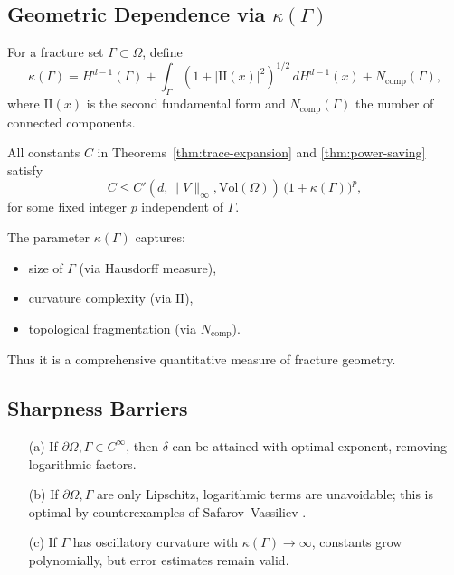 \subsection{Geometric Dependence via $\kappa(\Gamma)$}

\begin{definition}
\label{def:kappa}
For a fracture set $\Gamma \subset \Omega$, define
\[
\kappa(\Gamma) 
= H^{d-1}(\Gamma) 
+ \int_\Gamma (1+|\mathrm{II}(x)|^2)^{1/2}\,dH^{d-1}(x) 
+ N_{\mathrm{comp}}(\Gamma),
\]
where $\mathrm{II}(x)$ is the second fundamental form and $N_{\mathrm{comp}}(\Gamma)$ the number of connected components. 
\end{definition}

\begin{proposition}
\label{prop:kappa-dependence}
All constants $C$ in Theorems~\ref{thm:trace-expansion} and \ref{thm:power-saving} satisfy
\[
C \leq C'(d,\|V\|_\infty,\mathrm{Vol}(\Omega)) \,\big(1+\kappa(\Gamma)\big)^p,
\]
for some fixed integer $p$ independent of $\Gamma$. 
\end{proposition}

\begin{remark}[Interpretation]
The parameter $\kappa(\Gamma)$ captures: 
\begin{itemize}
  \item size of $\Gamma$ (via Hausdorff measure), 
  \item curvature complexity (via $\mathrm{II}$), 
  \item topological fragmentation (via $N_{\mathrm{comp}}$). 
\end{itemize}
Thus it is a comprehensive quantitative measure of fracture geometry. 
\end{remark}

\subsection{Sharpness Barriers}

\begin{theorem}
\label{thm:sharpness}
\begin{itemize}
  \item[(a)] If $\partial\Omega,\Gamma \in C^\infty$, then $\delta$ can be attained with optimal exponent, removing logarithmic factors. 
  \item[(b)] If $\partial\Omega,\Gamma$ are only Lipschitz, logarithmic terms are unavoidable; this is optimal by counterexamples of Safarov--Vassiliev \cite{SafarovVassiliev1997}. 
  \item[(c)] If $\Gamma$ has oscillatory curvature with $\kappa(\Gamma)\to\infty$, constants grow polynomially, but error estimates remain valid. 
\end{itemize}
\end{theorem}

